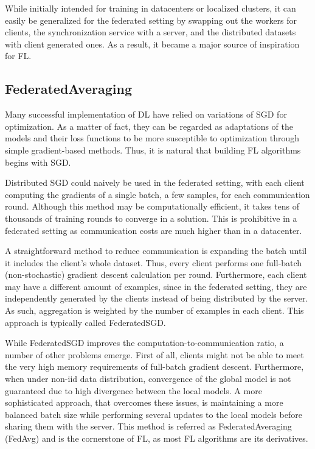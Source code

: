 While initially intended for training in datacenters or localized clusters, it can easily be generalized for the federated setting by swapping out the workers for clients, the synchronization service with a server, and the distributed datasets with client generated ones. As a result, it became a major source of inspiration for FL.

\subsection{FederatedAveraging}
Many successful implementation of DL have relied on variations of SGD for optimization. As a matter of fact, they can be regarded as adaptations of the models and their loss functions to be more susceptible to optimization through simple gradient-based methods. Thus, it is natural that building FL algorithms begins with SGD.

Distributed SGD could naively be used in the federated setting, with each client computing the gradients of a single batch, a few samples, for each communication round. Although this method may be computationally efficient, it takes tens of thousands of training rounds to converge in a solution. This is prohibitive in a federated setting as communication costs are much higher than in a datacenter.

A straightforward method to reduce communication is expanding the batch until it includes the client's whole dataset. Thus, every client performs one full-batch (non-stochastic) gradient descent calculation per round. Furthermore, each client may have a different amount of examples, since in the federated setting, they are independently generated by the clients instead of being distributed by the server. As such, aggregation is weighted by the number of examples in each client. This approach is typically called FederatedSGD. 


While FederatedSGD improves the computation-to-communication ratio, a number of other problems emerge. First of all, clients might not be able to meet the very high memory requirements of full-batch gradient descent. Furthermore, when under non-iid data distribution, convergence of the global model is not guaranteed due to high divergence between the local models. A more sophisticated approach, that overcomes these issues, is maintaining a more balanced batch size while performing several updates to the local models before sharing them with the server. This method is referred as FederatedAveraging (FedAvg) \cite{FL-original-paper} and is the cornerstone of FL, as most FL algorithms are its derivatives.

